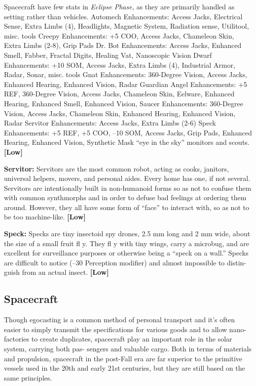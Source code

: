 Spacecraft have few stats in \textit{Eclipse Phase,} as they 
are primarily handled as setting rather than vehicles. 
Automech
Enhancements: Access Jacks, Electrical Sense, Extra Limbs (4), Headlights, Magnetic System, Radiation sense, Utilitool, misc. tools
Creepy 
Enhancements:\textbf{ }+5 COO, Access Jacks, Chameleon Skin, Extra Limbs (2-8), Grip Pads
Dr. Bot
Enhancements:\textbf{ }Access Jacks, Enhanced Smell, Fabber, Fractal Digits, Healing Vat, Nanoscopic Vision
Dwarf
Enhancements:\textbf{ }+10 SOM, Access Jacks, Extra Limbs (4), Industrial Armor, Radar, Sonar, misc. tools
Gnat
Enhancements:\textbf{ }360-Degree Vision, Access Jacks, Enhanced Hearing, Enhanced Vision, Radar
Guardian Angel
Enhancements: +5 REF, 360-Degree Vision, Access Jacks, Chameleon Skin, Eelware, Enhanced Hearing, Enhanced Smell, Enhanced Vision, 
Saucer
Enhancements:\textbf{ }360-Degree Vision, Access Jacks, Chameleon Skin, Enhanced Hearing, Enhanced Vision, Radar
Servitor
Enhancements:\textbf{ }Access Jacks, Extra Limbs (2-6)
Speck
Enhancements: +5 REF, +5 COO, –10 SOM, Access Jacks, Grip Pads, Enhanced Hearing, Enhanced Vision, Synthetic Mask
``eye in the sky'' monitors and scouts. \textbf{[Low]}

\textbf{Servitor:  }Servitors are the most common robot, 
acting as cooks, janitors, universal helpers, movers, 
and personal aides. Every home has one, if not several. 
Servitors are intentionally built in non-humanoid 
forms so as not to confuse them with common 
synthmorphs and in order to defuse bad feelings at 
ordering them around. However, they all have some 
form of ``face'' to interact with, so as not to be too 
machine-like. \textbf{[Low]}

\textbf{Speck:} Specks are tiny insectoid spy drones, 2.5 mm 
long and 2 mm wide, about the size of a small fruit fl y. 
They fl y with tiny wings, carry a microbug, and are 
excellent for surveillance purposes or otherwise being 
a ``speck on a wall.'' Specks are difficult to notice (–30 
Perception modifier) and almost impossible to distin-
guish from an actual insect. \textbf{[Low]}

\subsection{Spacecraft}

Though egocasting is a common method of personal 
transport and it's often easier to simply transmit the 
specifications for various goods and to allow nano-
factories to create duplicates, spacecraft play an 
important role in the solar system, carrying both pas-
sengers and valuable cargo. Both in terms of materials 
and propulsion, spacecraft in the post-Fall era are far 
superior to the primitive vessels used in the 20th and 
early 21st centuries, but they are still based on the 
same principles.

